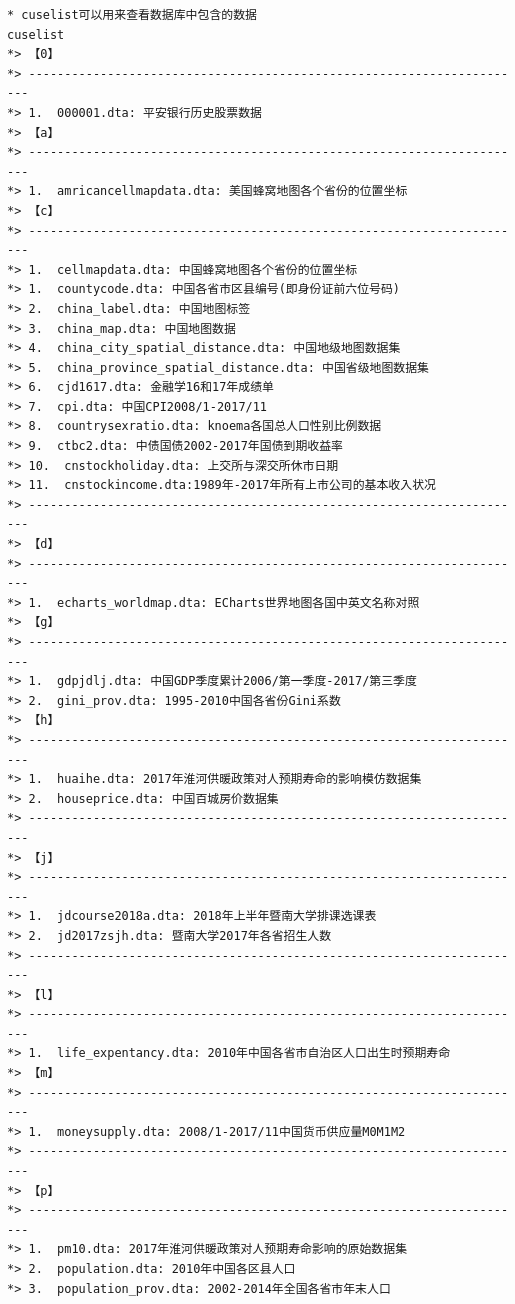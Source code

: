 \begin{lstlisting}
* cuselist可以用来查看数据库中包含的数据
cuselist
*> 【0】
*> ----------------------------------------------------------------------
*> 1.  000001.dta: 平安银行历史股票数据
*> 【a】
*> ----------------------------------------------------------------------
*> 1.  amricancellmapdata.dta: 美国蜂窝地图各个省份的位置坐标
*> 【c】
*> ----------------------------------------------------------------------
*> 1.  cellmapdata.dta: 中国蜂窝地图各个省份的位置坐标
*> 1.  countycode.dta: 中国各省市区县编号(即身份证前六位号码)
*> 2.  china_label.dta: 中国地图标签
*> 3.  china_map.dta: 中国地图数据
*> 4.  china_city_spatial_distance.dta: 中国地级地图数据集
*> 5.  china_province_spatial_distance.dta: 中国省级地图数据集
*> 6.  cjd1617.dta: 金融学16和17年成绩单
*> 7.  cpi.dta: 中国CPI2008/1-2017/11
*> 8.  countrysexratio.dta: knoema各国总人口性别比例数据
*> 9.  ctbc2.dta: 中债国债2002-2017年国债到期收益率
*> 10.  cnstockholiday.dta: 上交所与深交所休市日期
*> 11.  cnstockincome.dta:1989年-2017年所有上市公司的基本收入状况
*> ----------------------------------------------------------------------
*> 【d】
*> ----------------------------------------------------------------------
*> 1.  echarts_worldmap.dta: ECharts世界地图各国中英文名称对照
*> 【g】
*> ----------------------------------------------------------------------
*> 1.  gdpjdlj.dta: 中国GDP季度累计2006/第一季度-2017/第三季度
*> 2.  gini_prov.dta: 1995-2010中国各省份Gini系数
*> 【h】
*> ----------------------------------------------------------------------
*> 1.  huaihe.dta: 2017年淮河供暖政策对人预期寿命的影响模仿数据集
*> 2.  houseprice.dta: 中国百城房价数据集
*> ----------------------------------------------------------------------
*> 【j】
*> ----------------------------------------------------------------------
*> 1.  jdcourse2018a.dta: 2018年上半年暨南大学排课选课表
*> 2.  jd2017zsjh.dta: 暨南大学2017年各省招生人数
*> ----------------------------------------------------------------------
*> 【l】
*> ----------------------------------------------------------------------
*> 1.  life_expentancy.dta: 2010年中国各省市自治区人口出生时预期寿命
*> 【m】
*> ----------------------------------------------------------------------
*> 1.  moneysupply.dta: 2008/1-2017/11中国货币供应量M0M1M2
*> ----------------------------------------------------------------------
*> 【p】
*> ----------------------------------------------------------------------
*> 1.  pm10.dta: 2017年淮河供暖政策对人预期寿命影响的原始数据集
*> 2.  population.dta: 2010年中国各区县人口
*> 3.  population_prov.dta: 2002-2014年全国各省市年末人口

\end{lstlisting}
